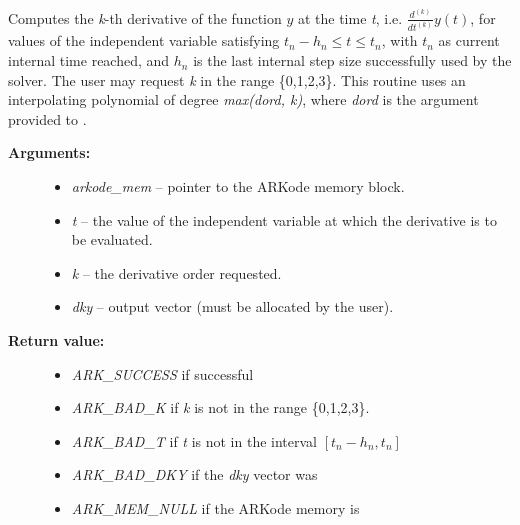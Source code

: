 \documentclass[letterpaper,10pt,english]{sphinxmanual}
\begin{document}
\begin{fulllineitems}
\label{c_interface/User_callable:ARKodeGetDky}
Computes the \emph{k}-th derivative of the function
$y$ at the time \emph{t},
i.e. $\frac{d^{(k)}}{dt^{(k)}}y(t)$, for values of the
independent variable satisfying $t_n-h_n \le t \le t_n$, with
$t_n$ as current internal time reached, and $h_n$ is
the last internal step size successfully used by the solver.  The
user may request \emph{k} in the range \{0,1,2,3\}.  This routine uses an
interpolating polynomial of degree \emph{max(dord, k)}, where \emph{dord} is the
argument provided to {\hyperref[c_interface/User_callable:ARKodeSetDenseOrder]{}}.
\begin{description}
\item[{\textbf{Arguments:}}] \leavevmode\begin{itemize}
\item {} 
\emph{arkode\_mem} -- pointer to the ARKode memory block.

\item {} 
\emph{t} -- the value of the independent variable at which the
derivative is to be evaluated.

\item {} 
\emph{k} -- the derivative order requested.

\item {} 
\emph{dky} -- output vector (must be allocated by the user).

\end{itemize}

\item[{\textbf{Return value:}}] \leavevmode\begin{itemize}
\item {} 
\emph{ARK\_SUCCESS} if successful

\item {} 
\emph{ARK\_BAD\_K} if \emph{k} is not in the range \{0,1,2,3\}.

\item {} 
\emph{ARK\_BAD\_T} if \emph{t} is not in the interval $[t_n-h_n, t_n]$

\item {} 
\emph{ARK\_BAD\_DKY} if the \emph{dky} vector was 

\item {} 
\emph{ARK\_MEM\_NULL} if the ARKode memory is 


\end{itemize}
\end{description}
\end{fulllineitems}
\end{document}
